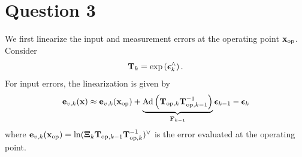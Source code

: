 \documentclass[a4paper]{article}
\begin{document}
\section*{Question 3}

We first linearize the input and measurement errors at the operating point $\bm{\mathbf{x}}_{\text{op}}$. 
Consider 
\begin{equation}
    \bm{\mathbf{T}}_k = \exp\left( \bm{\mathbf{\epsilon}}_k^\wedge \right).
\end{equation}
For input errors, the linearization is given by
\begin{equation}
    \bm{\mathbf{e}}_{v, k}(\bm{\mathbf{x}}) \approx \bm{\mathbf{e}}_{v, k}(\bm{\mathbf{x}}_{\text{op}}) + \underbrace{\text{Ad}\left( \bm{\mathbf{T}}_{\text{op}, k} \bm{\mathbf{T}}^{-1}_{\text{op}, k-1} \right)}_{\bm{\mathbf{F}}_{k-1}} \bm{\mathbf{\epsilon}}_{k-1} - \bm{\mathbf{\epsilon}}_{k}
\end{equation}
where $\bm{\mathbf{e}}_{v, k}(\bm{\mathbf{x}}_{\text{op}}) = \ln (\bm{\mathbf{\Xi}}_k \bm{\mathbf{T}}_{\text{op},k-1} \bm{\mathbf{T}}_{\text{op},k}^{-1})^\vee$ is the error evaluated at the operating point.
\end{document}
